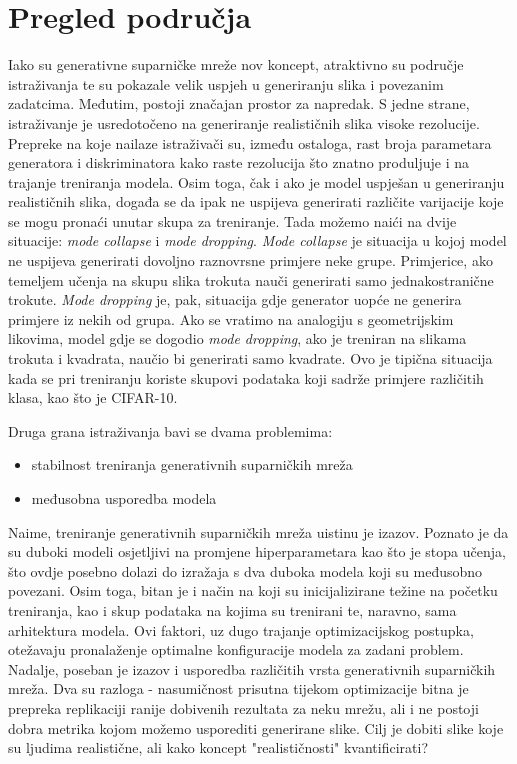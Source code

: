 \chapter{Pregled područja}
Iako su generativne suparničke mreže nov koncept, atraktivno su područje istraživanja te su pokazale velik uspjeh u generiranju slika i povezanim zadatcima. Međutim, postoji značajan prostor za napredak. S jedne strane, istraživanje je usredotočeno na generiranje realističnih slika visoke rezolucije. Prepreke na koje nailaze istraživači su, između ostaloga, rast broja parametara generatora i diskriminatora kako raste rezolucija što znatno produljuje i na trajanje treniranja modela. Osim toga, čak i ako je model uspješan u generiranju realističnih slika, događa se da ipak ne uspijeva generirati različite varijacije koje se mogu pronaći unutar skupa za treniranje. Tada možemo naići na dvije situacije: \textit{mode collapse} i \textit{mode dropping}. \textit{Mode collapse} je situacija u kojoj model ne uspijeva generirati dovoljno raznovrsne primjere neke grupe. Primjerice, ako temeljem učenja na skupu slika trokuta nauči generirati samo jednakostranične trokute. \textit{Mode dropping} je, pak, situacija gdje generator uopće ne generira primjere iz nekih od grupa. Ako se vratimo na analogiju s geometrijskim likovima, model gdje se dogodio \textit{mode dropping}, ako je treniran na slikama trokuta i kvadrata, naučio bi generirati samo kvadrate. Ovo je tipična situacija kada se pri treniranju koriste skupovi podataka koji sadrže primjere različitih klasa, kao što je CIFAR-10.


Druga grana istraživanja bavi se dvama problemima:
\begin{itemize}
	\item stabilnost treniranja generativnih suparničkih mreža
	\item međusobna usporedba modela
\end{itemize}
Naime, treniranje generativnih suparničkih mreža uistinu je izazov. Poznato je da su duboki modeli osjetljivi na promjene hiperparametara kao što je stopa učenja, što ovdje posebno dolazi do izražaja s dva duboka modela koji su međusobno povezani. Osim toga, bitan je i način na koji su inicijalizirane težine na početku treniranja, kao i skup podataka na kojima su trenirani te, naravno, sama arhitektura modela. Ovi faktori, uz dugo trajanje optimizacijskog postupka, otežavaju pronalaženje optimalne konfiguracije modela za zadani problem. Nadalje, poseban je izazov i usporedba različitih vrsta generativnih suparničkih mreža. Dva su razloga - nasumičnost prisutna tijekom optimizacije bitna je prepreka replikaciji ranije dobivenih rezultata za neku mrežu, ali i ne postoji dobra metrika kojom možemo usporediti generirane slike. Cilj je dobiti slike koje su ljudima realistične, ali kako koncept "realističnosti" kvantificirati?

